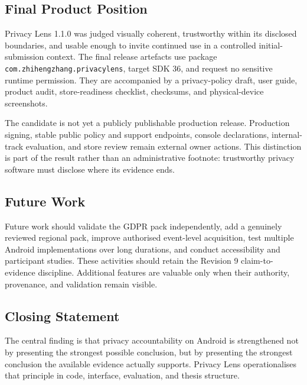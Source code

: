 \subsection{Final Product Position}

Privacy Lens 1.1.0 was judged visually coherent, trustworthy within its disclosed boundaries, and usable enough to invite continued use in a controlled initial-submission context. The final release artefacts use package \texttt{com.zhihengzhang.privacylens}, target SDK 36, and request no sensitive runtime permission. They are accompanied by a privacy-policy draft, user guide, product audit, store-readiness checklist, checksums, and physical-device screenshots.

The candidate is not yet a publicly publishable production release. Production signing, stable public policy and support endpoints, console declarations, internal-track evaluation, and store review remain external owner actions. This distinction is part of the result rather than an administrative footnote: trustworthy privacy software must disclose where its evidence ends.

\subsection{Future Work}

Future work should validate the GDPR pack independently, add a genuinely reviewed regional pack, improve authorised event-level acquisition, test multiple Android implementations over long durations, and conduct accessibility and participant studies. These activities should retain the Revision 9 claim-to-evidence discipline. Additional features are valuable only when their authority, provenance, and validation remain visible.

\subsection{Closing Statement}

The central finding is that privacy accountability on Android is strengthened not by presenting the strongest possible conclusion, but by presenting the strongest conclusion the available evidence actually supports. Privacy Lens operationalises that principle in code, interface, evaluation, and thesis structure.
